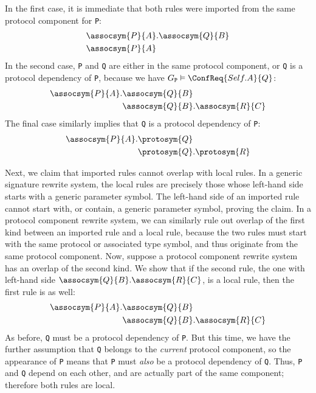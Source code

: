\documentclass[../generics]{subfiles}
\begin{document}
In the first case, it is immediate that both rules were imported from the same protocol component for \texttt{P}:
\begin{align*}
&\assocsym{P}{A}.\assocsym{Q}{B}\\
&\assocsym{P}{A}
\end{align*}
In the second case, \texttt{P} and \texttt{Q} are either in the same protocol component, or \texttt{Q} is a protocol dependency of \texttt{P}, because we have $G_\texttt{P}\vDash\ConfReq{Self.A}{Q}$:
\begin{align*}
\assocsym{P}{A}.&\assocsym{Q}{B}\\
&\assocsym{Q}{B}.\assocsym{R}{C}
\end{align*}
The final case similarly implies that \texttt{Q} is a protocol dependency of \texttt{P}:
\begin{align*}
\assocsym{P}{A}.&\protosym{Q}\\
&\protosym{Q}.\protosym{R}
\end{align*}

Next, we claim that imported rules cannot overlap with local rules. In a generic signature rewrite system, the local rules are precisely those whose left-hand side starts with a generic parameter symbol. The left-hand side of an imported rule cannot start with, or contain, a generic parameter symbol, proving the claim. In a protocol component rewrite system, we can similarly rule out overlap of the first kind between an imported rule and a local rule, because the two rules must start with the same protocol or associated type symbol, and thus originate from the same protocol component. Now, suppose a protocol component rewrite system has an overlap of the second kind. We show that if the second rule, the one with left-hand side $\assocsym{Q}{B}.\assocsym{R}{C}$, is a local rule, then the first rule is as well:
\begin{align*}
\assocsym{P}{A}.&\assocsym{Q}{B}\\
&\assocsym{Q}{B}.\assocsym{R}{C}
\end{align*}
As before, \texttt{Q} must be a protocol dependency of \texttt{P}. But this time, we have the further assumption that \texttt{Q} belongs to the \emph{current} protocol component, so the appearance of \texttt{P} means that \texttt{P} must \emph{also} be a protocol dependency of \texttt{Q}. Thus, \texttt{P} and \texttt{Q} depend on each other, and are actually part of the same component; therefore both rules are local.
\end{document}

